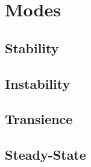 \section*{Modes}
\subsection*{Stability}
\subsection*{Instability}
\subsection*{Transience}
\subsection*{Steady-State}